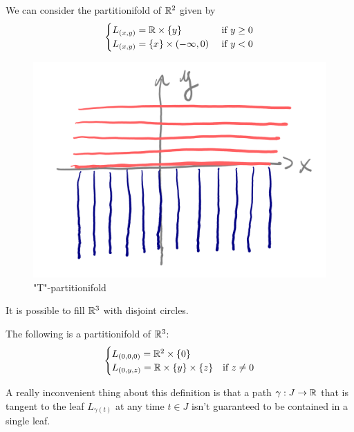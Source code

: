 	\begin{example}[``T'' partitionifold]
		We can consider the partitionifold of $\mathbb{R}^2$ given by
		$$
		\begin{cases}
			L_{(x,y)} = \mathbb{R} \times \{y\}            &\text{ if } y \geq 0 \\
			L_{(x,y)} = \{x\} \times (-\infty, 0)  &\text{ if } y < 0
		\end{cases}
		$$

		\begin{figure}[H]
		    \centering
		    \includegraphics[width=0.8\linewidth]{T-foliation.png}
		    \caption{"T"-partitionifold}
		    \label{fig:enter-label}
		\end{figure}
	\end{example}

	\begin{example}
		It is possible to fill $\mathbb{R}^3$ with disjoint circles. 
	\end{example}

    \begin{example}
        The following is a partitionifold of $\mathbb{R}^3$:
%
        \begin{align*}
            \begin{cases}
                L_{(0, 0, 0)} = \mathbb{R}^2 \times \{0\} \\
                L_{(0, y, z)} = \mathbb{R} \times \{y\} \times\{z\} &\text{if $z \neq 0$} 
            \end{cases}
        \end{align*}
    \end{example}

	A really inconvenient thing about this definition is that a path $\gamma : J \to \mathbb{R}$ that is tangent to the leaf $L_{\gamma(t)}$ at any time $t \in J$ isn't guaranteed to be contained in a single leaf.

